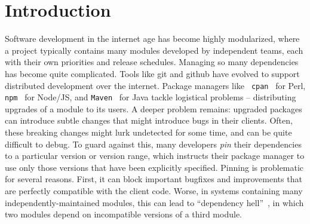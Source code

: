 \section{Introduction}

Software development in the internet age has become highly
modularized, where a project typically contains many modules developed
by independent teams, each with their own priorities and release
schedules. Managing so many dependencies has become quite
complicated. Tools like git and github have evolved to support
distributed development over the internet. Package managers like {\tt
  cpan}~\cite{cpan} for Perl, {\tt npm}~\cite{npm} for Node/JS, and
{\tt Maven}~\cite{maven} for Java tackle logistical problems --
distributing upgrades of a module to its users. A deeper problem
remains: upgraded packages can introduce subtle changes that might
introduce bugs in their clients. Often, these breaking changes might
lurk undetected for some time, and can be quite difficult to debug. To
guard against this, many developers {\em pin} their dependencies to a
particular version or version range, which instructs their package
manager to use only those versions that have been explicitly
specified. Pinning is problematic for several reasons.
%
First, it can block important bugfixes and improvements that are
perfectly compatible with the client code.
%
Worse, in systems containing many independently-maintained modules,
this can lead to ``dependency hell''~\cite{hell}, in which two modules
depend on incompatible versions of a third module.



